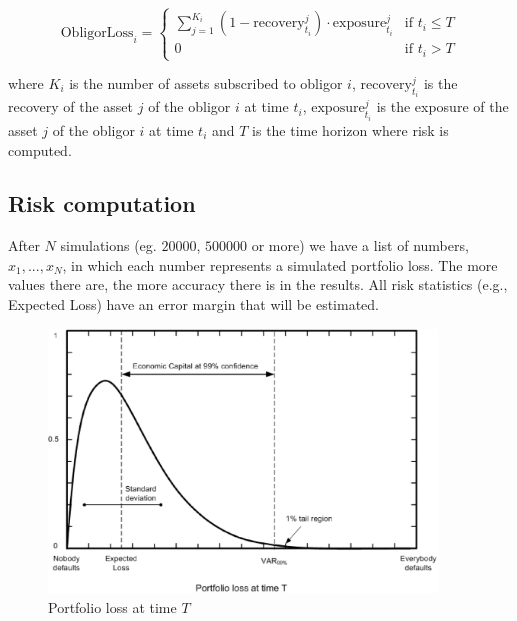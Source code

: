 \documentclass[a4paper,12pt,final]{article}
\begin{document}
\begin{displaymath}
\mathrm{ObligorLoss}_{i} = \left\{
\begin{array}{ll}
\sum_{j=1}^{K_i} (1 - \mathrm{recovery}_{t_i}^j) \cdot \mathrm{exposure}_{t_i}^j & \textrm{if  } t_i \le T \\
0 & \textrm{if  } t_i > T
\end{array}
\right.
\end{displaymath}

where $K_i$ is the number of assets subscribed to obligor $i$, 
$\mathrm{recovery}_{t_i}^j$ is the recovery of the asset $j$ of the obligor $i$ at time $t_i$,
$\mathrm{exposure}_{t_i}^j$ is the exposure of the asset $j$ of the obligor $i$ at time $t_i$
and $T$ is the time horizon where risk is computed.

\subsection{Risk computation}
After $N$ simulations (eg. $20000$, $500000$ or more) we have a list
of numbers, ${x_1, ..., x_N}$, in which each number represents a simulated portfolio 
loss. The more values there are, the more accuracy there is in the results. All risk 
statistics (e.g., Expected Loss) have an error margin that will be estimated.
\newline

\begin{figure}[!hbt]
\begin{center}
\includegraphics[height=7cm, angle=0]{./images/creditvar.eps}
\caption{Portfolio loss at time $T$}
\label{creditvar}
\end{center}
\end{figure}
\FloatBarrier

\end{document}
